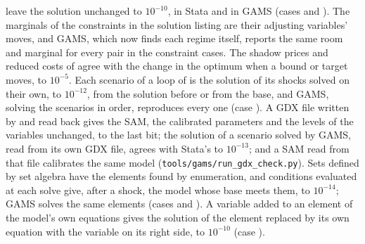 leave the solution unchanged to $10^{-10}$, in Stata and in GAMS (cases
 and ). The marginals of the constraints in the
solution listing are their adjusting variables' moves, and GAMS, which now
finds each regime itself, reports the same room and marginal for every pair in
the constraint cases. The shadow prices and reduced costs of
 agree with the change in the optimum when a bound or
target moves, to $10^{-5}$. Each scenario of a loop of  is
the solution of its shocks solved on their own, to $10^{-12}$, from the
solution before or from the base, and GAMS, solving the scenarios in order,
reproduces every one (case ). A GDX file written by 
and read back gives the SAM, the calibrated parameters and the levels of the
variables unchanged, to the last bit; the solution of a scenario solved by GAMS,
read from its own GDX file, agrees with Stata's to $10^{-13}$; and a SAM read
from that file calibrates the same model (\texttt{tools/gams/run\_gdx\_check.py}).
Sets defined by set algebra have the elements found by enumeration, and
conditions evaluated at each solve give, after a shock, the model whose base
meets them, to $10^{-14}$; GAMS solves the same elements (cases
 and ). A variable added to an element of the model's own equations
gives the solution of the element replaced by its own equation with the
variable on its right side, to $10^{-10}$ (case ).

